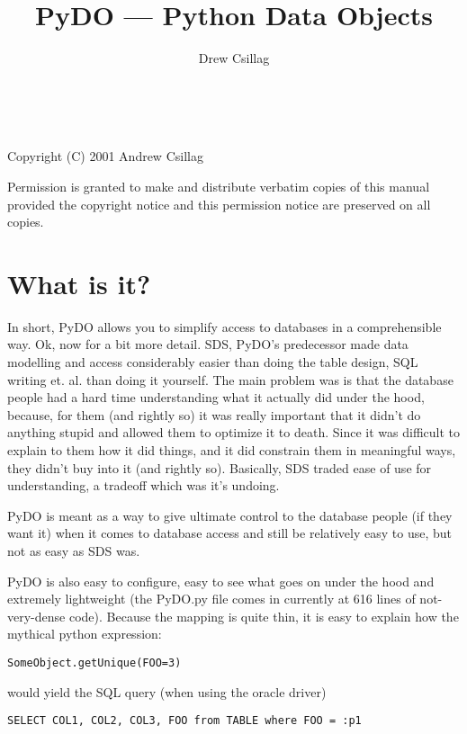 \documentclass[titlepage]{manual}
\title{PyDO --- Python Data Objects}
\author{Drew Csillag}
\begin{document}
\newcommand{\argdescitem}[1]{\hspace\labelsep
                                \normalfont\ttfamily #1\ }
\newenvironment{argdesc}{\begin{list}{}{
        \renewcommand{\makelabel}{\argdescitem}
}
}{\end{list}}

\newcommand{\doref}[1]{(see section \ref{#1}, page \pageref{#1})}
\maketitle
\ 
\vfill 

\noindent
Copyright (C) 2001 Andrew Csillag

\noindent
Permission is granted to make and distribute verbatim copies of
this manual provided the copyright notice and this permission notice
are preserved on all copies.


\tableofcontents



\chapter{What is it?}
In short, PyDO allows you to simplify access to databases in a
comprehensible way.  Ok, now for a bit more detail.  SDS, PyDO's
predecessor made data modelling and access considerably easier than
doing the table design, SQL writing et. al. than doing it yourself.
The main problem was is that the database people had a hard time
understanding what it actually did under the hood, because, for them
(and rightly so) it was really important that it didn't do anything
stupid and allowed them to optimize it to death.  Since it was
difficult to explain to them how it did things, and it did constrain
them in meaningful ways, they didn't buy into it (and rightly so).
Basically, SDS traded ease of use for understanding, a tradeoff which
was it's undoing.

PyDO is meant as a way to give ultimate control to the database people
(if they want it) when it comes to database access and still be
relatively easy to use, but not as easy as SDS was. 

PyDO is also easy to configure, easy to see what goes on under the
hood and extremely lightweight (the PyDO.py file comes in currently at
616 lines of not-very-dense code).  Because the mapping is quite
thin, it is easy to explain how the mythical python expression:
\begin{verbatim}
SomeObject.getUnique(FOO=3)
\end{verbatim}
would yield the SQL query (when using the oracle driver)
\begin{verbatim}
SELECT COL1, COL2, COL3, FOO from TABLE where FOO = :p1 
\end{verbatim}
\end{document}
